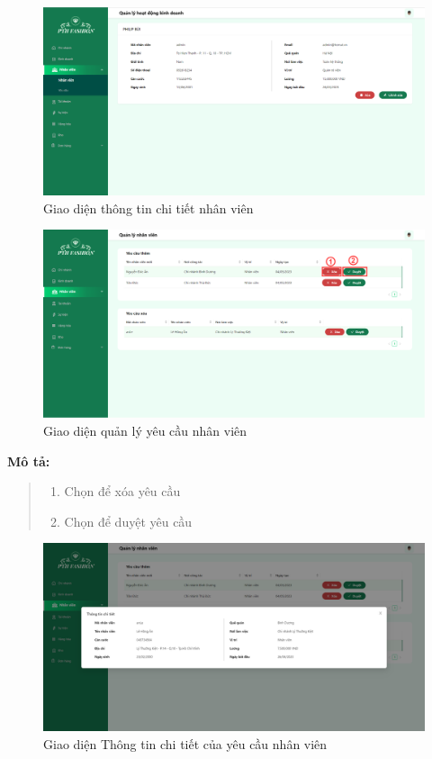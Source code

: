 \begin{figure}[!htp]
    \centering
    \includegraphics[width=12cm]{img/UI/admin_implement/staffDetail.png}
    \newline
    \caption{Giao diện thông tin chi tiết nhân viên}
\end{figure}

\begin{figure}[!htp]
    \centering
    \includegraphics[width=12cm]{img/UI/admin_implement/staffRequest.png}
    \newline
    \caption{Giao diện quản lý yêu cầu nhân viên}
\end{figure}
\textbf{Mô tả:}
\begin{quote}
    \begin{enumerate}
        \item Chọn để xóa yêu cầu
        \item Chọn để duyệt yêu cầu
    \end{enumerate}
\end{quote}

\begin{figure}[!htp]
    \centering
    \includegraphics[width=12cm]{img/UI/admin_implement/staffRequestDetail.png}
    \newline
    \caption{Giao diện Thông tin chi tiết của yêu cầu nhân viên}
\end{figure}

